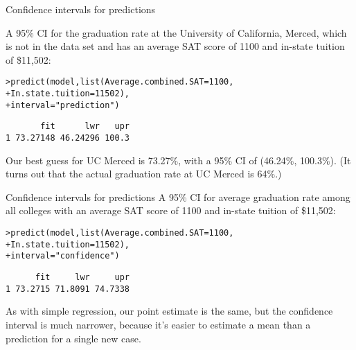 \documentclass{beamer}\usepackage[]{graphicx}\usepackage[]{color}
\makeatletter
\newcommand{\hlnum}[1]{\textcolor[rgb]{0.824,0.412,0.118}{#1}}%
\newcommand{\hlstr}[1]{\textcolor[rgb]{1,0.894,0.71}{#1}}%
\newcommand{\hlstd}[1]{\textcolor[rgb]{1,0.894,0.769}{#1}}%
\newcommand{\hlkwc}[1]{\textcolor[rgb]{0.78,0.941,0.545}{#1}}%
\newcommand{\hlkwd}[1]{\textcolor[rgb]{1,0.78,0.769}{#1}}%
\newenvironment{kframe}{%
 \def\at@end@of@kframe{}%
 \ifinner\ifhmode%
  \def\at@end@of@kframe{\end{minipage}}%
  \begin{minipage}{\columnwidth}%
 \fi\fi%
 \def\FrameCommand##1{\hskip\@totalleftmargin \hskip-\fboxsep
 \colorbox{shadecolor}{##1}\hskip-\fboxsep
     \hskip-\linewidth \hskip-\@totalleftmargin \hskip\columnwidth}%
 \MakeFramed {\advance\hsize-\width
   \@totalleftmargin\z@ \linewidth\hsize
   \@setminipage}}%
 {\par\unskip\endMakeFramed%
 \at@end@of@kframe}
\newenvironment{knitrout}{}{} %
\makeatother
\begin{document}
\begin{darkframes}
\begin{frame}[fragile]{Confidence intervals for predictions}
      \bigskip\pause

      A 95\% CI for the graduation rate at the University of California, Merced, which is not in the data set and has an average SAT score of 1100 and in-state tuition of \$11,502:
\begin{knitrout}
\begin{kframe}
\begin{alltt}
\hlstd{> }\hlkwd{predict}\hlstd{(model,} \hlkwd{list}\hlstd{(}\hlkwc{Average.combined.SAT}\hlstd{=}\hlnum{1100}\hlstd{,}
\hlstd{+ }                    \hlkwc{In.state.tuition}\hlstd{=}\hlnum{11502}\hlstd{),}
\hlstd{+ }               \hlkwc{interval}\hlstd{=}\hlstr{"prediction"}\hlstd{)}
\end{alltt}
\begin{verbatim}
       fit      lwr   upr
1 73.27148 46.24296 100.3
\end{verbatim}
\end{kframe}
\end{knitrout}
      

      \pause

      Our best guess for UC Merced is 73.27\%, with a 95\% CI of (46.24\%, 100.3\%). \pause (It turns out that the actual graduation rate at UC Merced is 64\%.)
    \end{frame}

    \begin{frame}[fragile]{Confidence intervals for predictions}
      \fontsm
      A 95\% CI for average graduation rate among all colleges with an average SAT score of 1100 and in-state tuition of \$11,502:
      
\begin{knitrout}
\begin{kframe}
\begin{alltt}
\hlstd{> }\hlkwd{predict}\hlstd{(model,} \hlkwd{list}\hlstd{(}\hlkwc{Average.combined.SAT}\hlstd{=}\hlnum{1100}\hlstd{,}
\hlstd{+ }                    \hlkwc{In.state.tuition}\hlstd{=}\hlnum{11502}\hlstd{),}
\hlstd{+ }               \hlkwc{interval}\hlstd{=}\hlstr{"confidence"}\hlstd{)}
\end{alltt}
\begin{verbatim}
      fit     lwr     upr
1 73.2715 71.8091 74.7338
\end{verbatim}
\end{kframe}
\end{knitrout}

      \bigskip\pause

      As with simple regression, our point estimate is the same, but the confidence interval is much narrower, because it's easier to estimate a mean than a prediction for a single new case.
    \end{frame}
  \end{darkframes}
\end{document}
